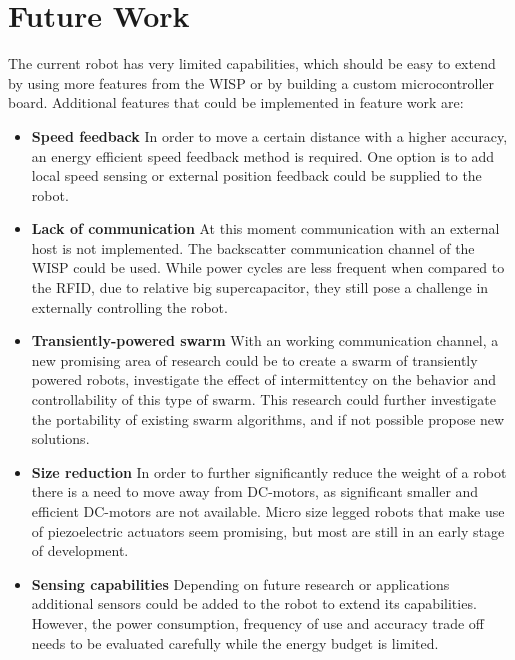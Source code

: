\section{Future Work}
\label{sec:limitations_future_work}

The current robot has very limited capabilities, which should be easy to extend by using more features from the WISP or by building a custom microcontroller board.
Additional features that could be implemented in feature work are:

\begin{itemize}

\item \textbf{Speed feedback} 
In order to move a certain distance with a higher accuracy, an energy efficient speed feedback method is required.
One option is to add local speed sensing or external position feedback could be supplied to the robot.


\item \textbf{Lack of communication}
At this moment communication with an external host is not implemented.
The backscatter communication channel of the WISP could be used.
While power cycles are less frequent when compared to the RFID, due to relative big supercapacitor, they still pose a challenge in externally controlling the robot.

\item \textbf{Transiently-powered swarm}
With an working communication channel, a new promising area of research could be to create a swarm of transiently powered robots, investigate the effect of intermittentcy on the behavior and controllability of this type of swarm.
This research could further investigate the portability of existing swarm algorithms, and if not possible propose new solutions.	

\item \textbf{Size reduction} 
In order to further significantly reduce the weight of a robot there is a need to move away from DC-motors, as significant smaller and efficient DC-motors are not available.
Micro size legged robots that make use of piezoelectric actuators seem promising, but most are still in an early stage of development.

\item \textbf{Sensing capabilities}
Depending on future research or applications additional sensors could be added to the robot to extend its capabilities.
However, the power consumption, frequency of use and accuracy trade off needs to be evaluated carefully while the energy budget is limited.


\end{itemize}


